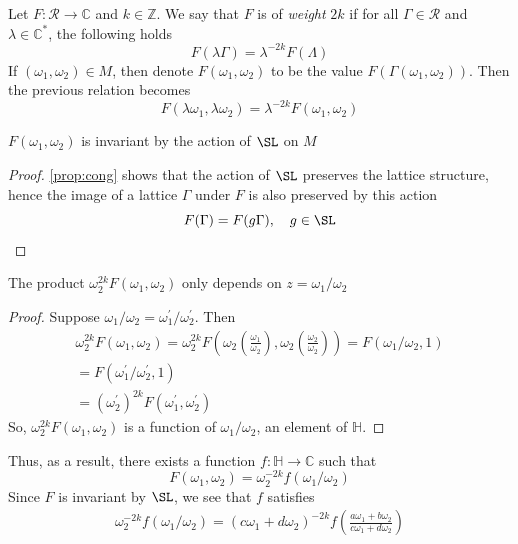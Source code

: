 \documentclass[12pt]{article}
\theoremstyle{definition}
\begin{document}
Let \(F:\mathscr{R} \to \mathbb{C} \) and \(k\in \mathbb{Z} \). We say that \(F\) is of \textit{weight} \(2k\) if for all \(\Gamma \in \mathscr{R} \) and \(\lambda \in \mathbb{C} ^{\ast} \), the following holds 
\[
    F(\lambda \Gamma ) = \lambda ^{-2k}F(\Lambda )
\]   
If \((\omega _1,\omega _2)\in M\), then denote \(F(\omega _1,\omega _2)\) to be the value \(F(\Gamma (\omega _1,\omega _2))\). Then the previous relation becomes
\[
    F(\lambda \omega _1,\lambda \omega _2) = \lambda ^{-2k} F(\omega _1,\omega _2)
\]   
\begin{claim}
    \(F(\omega _1,\omega _2)\) is invariant by the action of \(\SL\) on \(M\)   
\end{claim}
\begin{proof}
\cref{prop:cong} shows that the action of \(\SL\) preserves the lattice structure, hence the image of a lattice \(\Gamma \) under \(F\) is also preserved by this action
\[
    F(\Gamma ) = F(g \Gamma ),\quad g \in \SL
\]
\end{proof}
\begin{claim}
    The product \(\omega_2^{2k}F(\omega _1,\omega _2)\) only depends on \(z=\omega _1/\omega _2\)  
\end{claim}
\begin{proof}
Suppose \(\omega_1/\omega_2 =\omega_1^{\prime} /\omega_2^{\prime}  \). Then
\begin{align*}
    \omega_2^{2k}F(\omega _1,\omega _2) = \omega_2^{2k}F\left(\omega _2 \left(\frac{\omega_1 }{\omega_2}\right),\omega _2\left(\frac{\omega_2 }{\omega_2}\right)\right) = F(\omega_1/\omega_2,1) \\= F(\omega_1^{\prime} /\omega_2^{\prime} ,1) \\= (\omega_2^{\prime})^{2k}F(\omega _1^{\prime} ,\omega _2^{\prime} ) 
\end{align*}
So, \(\omega_2^{2k}F(\omega _1,\omega _2)\) is a function of \(\omega_1/\omega_2\), an element of \(\mathbb{H} \).   
\end{proof}
Thus, as a result, there exists a function \(f:\mathbb{H}\to  \mathbb{C} \) such that
\[
    F(\omega _1,\omega _2) = \omega _2^{-2k} f(\omega _1/\omega _2)
\] 
Since \(F\) is invariant by \(\SL\), we see that \(f\) satisfies 
\begin{align*}
    \omega _2^{-2k} f(\omega _1/\omega _2) = (c \omega _1 + d \omega _2)^{-2k} f\left(\frac{a \omega _1 + b \omega _2}{ c \omega _1 + d \omega _2}\right) 
\end{align*}
\end{document}
